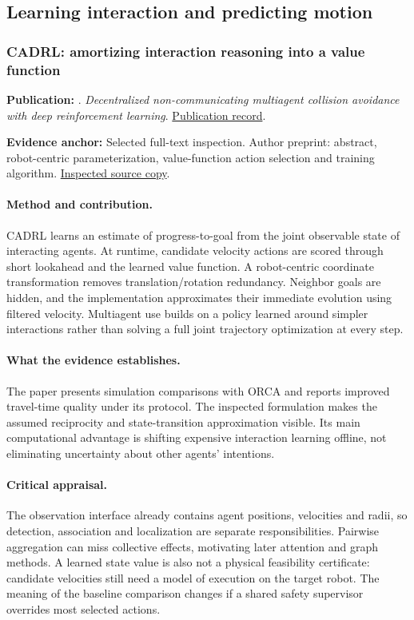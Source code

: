 \subsection{Learning interaction and predicting motion}
\subsubsection{CADRL: amortizing interaction reasoning into a value function}\label{paper:cadrl}
\textbf{Publication:} \citet{cadrl}. \emph{Decentralized non-communicating multiagent collision avoidance with deep reinforcement learning}. \href{https://doi.org/10.1109/icra.2017.7989037}{Publication record}.

\textbf{Evidence anchor:} Selected full-text inspection. Author preprint: abstract, robot-centric parameterization, value-function action selection and training algorithm. \href{https://arxiv.org/pdf/1609.07845}{Inspected source copy}.

\paragraph{Method and contribution.} CADRL learns an estimate of progress-to-goal from the joint observable state of interacting agents. At runtime, candidate velocity actions are scored through short lookahead and the learned value function. A robot-centric coordinate transformation removes translation/rotation redundancy. Neighbor goals are hidden, and the implementation approximates their immediate evolution using filtered velocity. Multiagent use builds on a policy learned around simpler interactions rather than solving a full joint trajectory optimization at every step.

\paragraph{What the evidence establishes.} The paper presents simulation comparisons with ORCA and reports improved travel-time quality under its protocol. The inspected formulation makes the assumed reciprocity and state-transition approximation visible. Its main computational advantage is shifting expensive interaction learning offline, not eliminating uncertainty about other agents' intentions.

\paragraph{Critical appraisal.} The observation interface already contains agent positions, velocities and radii, so detection, association and localization are separate responsibilities. Pairwise aggregation can miss collective effects, motivating later attention and graph methods. A learned state value is also not a physical feasibility certificate: candidate velocities still need a model of execution on the target robot. The meaning of the baseline comparison changes if a shared safety supervisor overrides most selected actions.


